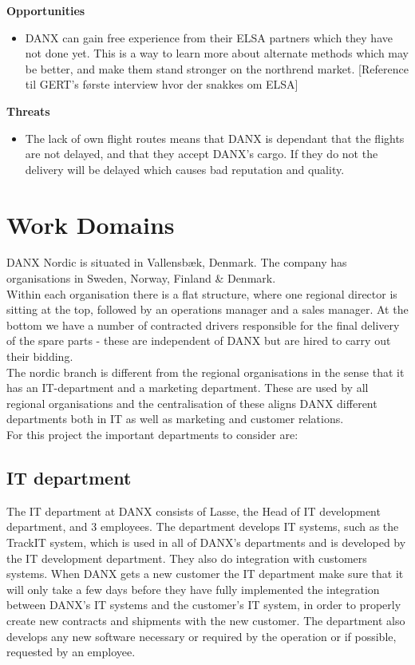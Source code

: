 \textbf{Opportunities}
\begin{itemize}
\item DANX can gain free experience from their ELSA partners which they have not done yet. This is a way to learn more about alternate methods which may be better, and make them stand stronger on the northrend market. [Reference til GERT’s første interview hvor der snakkes om ELSA]
\end{itemize}


\textbf{Threats}
\begin{itemize}
\item The lack of own flight routes means that DANX is dependant that the flights are not delayed, and that they accept DANX’s cargo. If they do not the delivery will be delayed which causes bad reputation and quality.
\end{itemize}




\section*{Work Domains}

DANX Nordic is situated in Vallensbæk, Denmark. The company has organisations in Sweden, Norway, Finland \& Denmark.\\

Within each organisation there is a flat structure, where one regional director is sitting at the top, followed by an operations manager and a sales manager. At the bottom we have a number of contracted drivers responsible for the final delivery of the spare parts - these are independent of DANX but are hired to carry out their bidding.\\

The nordic branch is different from the regional organisations in the sense that it has an IT-department and a marketing department. These are used by all regional organisations and the centralisation of these aligns DANX different departments both in IT as well as marketing and customer relations.\\

For this project the important departments to consider are:

\subsection{IT department}
The IT department at DANX consists of Lasse, the Head of IT development department, and 3 employees. The department develops IT systems, such as the TrackIT system, which is used in all of DANX's departments and is developed by the IT development department. They also do integration with customers systems. When DANX gets a new customer the IT department make sure that it will only take a few days before they have fully implemented the integration between DANX’s IT systems and the customer’s IT system, in order to properly create new contracts and shipments with the new customer. The department also develops any new software necessary or required by the operation or if possible, requested by an employee. \\

